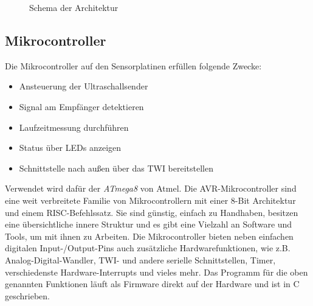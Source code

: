 \begin{figure}[H]
\caption{Schema der Architektur} \label{fig:ARCH}
\end{figure}


\subsection{Mikrocontroller}
Die Mikrocontroller auf den Sensorplatinen erfüllen folgende Zwecke:
\begin{itemize}
	\item Ansteuerung der Ultraschallsender
	\item Signal am Empfänger detektieren
	\item Laufzeitmessung durchführen
	\item Status über \ac{LED}s anzeigen
	\item Schnittstelle nach außen über das \ac{TWI} bereitstellen
\end{itemize}
Verwendet wird dafür der \textit{ATmega8} von Atmel. Die AVR-Mikrocontroller sind eine weit verbreitete Familie von
Mikrocontrollern mit einer 8-Bit Architektur und einem \ac{RISC}-Befehlssatz. Sie sind günstig, einfach zu Handhaben, besitzen eine übersichtliche innere Struktur und es gibt eine Vielzahl an Software und Tools, um mit ihnen zu Arbeiten. Die Mikrocontroller bieten neben einfachen digitalen Input-/Output-Pins auch zusätzliche Hardwarefunktionen, wie z.B. Analog-Digital-Wandler, \ac{TWI}- und andere serielle Schnittstellen, Timer, verschiedenste Hardware-Interrupts und vieles mehr. Das Programm für die oben genannten Funktionen läuft als Firmware direkt auf der Hardware und ist in C geschrieben.


